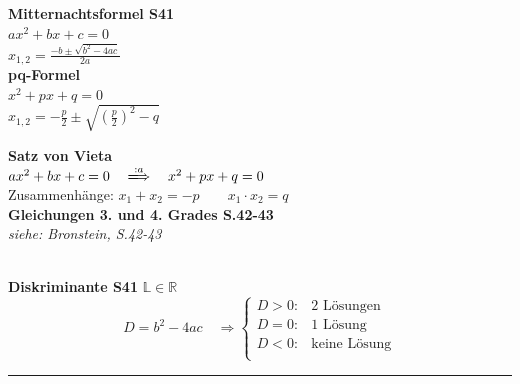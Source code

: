 	\begin{minipage}[b]{0.33\textwidth}		
		\begin{minipage}[t]{0.3\textwidth}			
			\textbf{Mitternachtsformel \color{red} S41}\\[1ex]
				$ax^2+bx+c=0$ \\
				$x_{1,2}=\frac{-b\pm\sqrt{b^2-4ac}}{2a}$\\
	
			\textbf{pq-Formel}\\[1ex]
				$x^{2}+p x+q=0$\\			
				$x_{1,2}=-\frac{p}{2} \pm \sqrt{\left(\frac{p}{2}\right)^{2}-q}$\\
		\end{minipage}
		\hspace{1mm}
		\vrule
		\hspace{1mm}
		\begin{minipage}[t]{0.6 \textwidth}			
			\textbf{Satz von Vieta}\\[1ex]
				$ ax^2+bx+c=0 \quad \xLongrightarrow{:a} \quad x^{2}+p x+q=0 $ \\		
				   		
		   		Zusammenhänge: $ x_{1}+x_{2}=-p \qquad x_{1} \cdot x_{2}=q $	\\
		   		
		   
		   \textbf{Gleichungen 3. und 4. Grades \color{red} S.42-43}\\[1ex]
		   \textit{siehe: Bronstein, S.42-43}
		\end{minipage}
	\\[1mm]
			\textbf{Diskriminante {\color{red} S41}} $\mathbb{L}\in \mathbb{R}$ \\
				\begin{equation*}
					D = b^{2}-4ac \quad \Rightarrow
					\begin{cases}
						 D > 0: & \text{2 Lösungen}\\
						 D = 0: & \text{1 Lösung}\\
						 D < 0: & \text{keine Lösung}\\
					\end{cases}
				\end{equation*}
		\end{minipage}


\vspace{1mm}
\hrule

